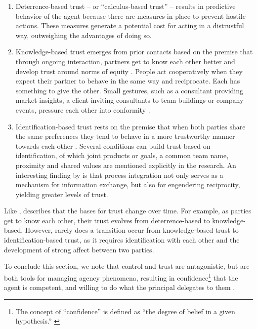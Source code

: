 \documentclass[12pt]{article}
\providecommand{\tightlist}{%
  \setlength{\itemsep}{0pt}\setlength{\parskip}{0pt}}
\begin{document}
\begin{enumerate}
\def\labelenumi{\arabic{enumi}.}
\tightlist
\item
  Deterrence-based trust -- or ``calculus-based trust'' \citep[
  119]{lewicki1996} -- results in predictive behavior of the agent
  because there are measures in place to prevent hostile actions. These
  measures generate a potential cost for acting in a distrustful way,
  outweighing the advantages of doing so.
\item
  Knowledge-based trust emerges from prior contacts based on the premise
  that through ongoing interaction, partners get to know each other
  better and develop trust around norms of equity \citep[
  92]{gulati1995}. People act cooperatively when they expect their
  partner to behave in the same way and reciprocate. Each has something
  to give the other. Small gestures, such as a consultant providing
  market insights, a client inviting consultants to team buildings or
  company events, pressure each other into conformity \citep[
  63]{macaulay1963}.
\item
  Identification-based trust rests on the premise that when both parties
  share the same preferences they tend to behave in a more trustworthy
  manner towards each other \citep[ 371]{shapiro1992}. Several
  conditions can build trust based on identification, of which joint
  products or goals, a common team name, proximity and shared values are
  mentioned explicitly in the research. An interesting finding by
  \citet[408]{schoenherr2015} is that process integration not only
  serves as a mechanism for information exchange, but also for
  engendering reciprocity, yielding greater levels of trust.
\end{enumerate}

Like \citet{kirilov2012}, \citet[1011]{lewicki2006} describes that the
bases for trust change over time. For example, as parties get to know
each other, their trust evolves from deterrence-based to
knowledge-based. However, rarely does a transition occur from
knowledge-based trust to identification-based trust, as it requires
identification with each other and the development of strong affect
between two parties.

To conclude this section, we note that control and trust are
antagonistic, but are both tools for managing agency phenomena,
resulting in confidence\footnote{The concept of ``confidence'' is
  defined as ``the degree of belief in a given hypothesis.'' \citep[
  412]{tversky1992}} that the agent is competent, and willing to do what
the principal delegates to them \citep[ 802-813]{castelfranchi2000}.
\end{document}
